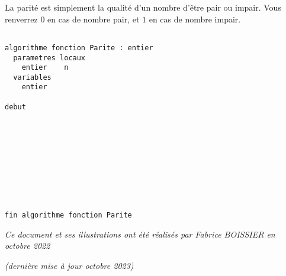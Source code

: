 \documentclass[11pt,a4paper]{article}
\begin{document}
\vfillLast


\newpage


\vfillFirst


La parité est simplement la qualité d'un nombre d'être pair ou impair.
Vous renverrez $ 0 $ en cas de nombre pair, et $ 1 $ en cas de nombre impair.

\bigskip


\begin{center}

\begin{lstlisting}[style=algorithmique]

algorithme fonction Parite : entier
  parametres locaux
    entier    n
  variables
    entier

debut










fin algorithme fonction Parite
\end{lstlisting}

\end{center}


\vfillLast


\begin{center}
\textit{Ce document et ses illustrations ont été réalisés par Fabrice BOISSIER en octobre 2022}

\textit{(dernière mise à jour octobre 2023)}
\end{center}
\end{document}
